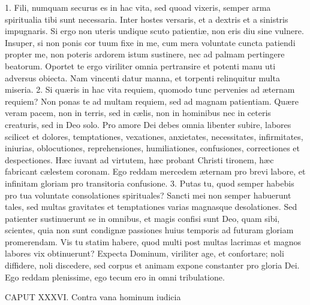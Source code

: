 1. Fili, numquam securus es in hac vita, sed quoad vixeris, semper arma spiritualia tibi sunt necessaria. Inter hostes versaris, et a dextris et a sinistris impugnaris. Si ergo non uteris undique scuto patientiæ, non eris diu sine vulnere. Insuper, si non ponis cor tuum fixe in me, cum mera voluntate cuncta patiendi propter me, non poteris ardorem istum sustinere, nec ad palmam pertingere beatorum. Oportet te ergo viriliter omnia pertransire et potenti manu uti adversus obiecta. Nam vincenti datur manna, et torpenti relinquitur multa miseria.
2. Si quæris in hac vita requiem, quomodo tunc pervenies ad æternam requiem? Non ponas te ad multam requiem, sed ad magnam patientiam. Quære veram pacem, non in terris, sed in cælis, non in hominibus nec in ceteris creaturis, sed in Deo solo. Pro amore Dei debes omnia libenter subire, labores scilicet et dolores, temptationes, vexationes, anxietates, necessitates, infirmitates, iniurias, oblocutiones, reprehensiones, humiliationes, confusiones, correctiones et despectiones. Hæc iuvant ad virtutem, hæc probant Christi tironem, hæc fabricant cælestem coronam. Ego reddam mercedem æternam pro brevi labore, et infinitam gloriam pro transitoria confusione.
3. Putas tu, quod semper habebis pro tua voluntate consolationes spirituales? Sancti mei non semper habuerunt tales, sed multas gravitates et temptationes varias magnasque desolationes. Sed patienter sustinuerunt se in omnibus, et magis confisi sunt Deo, quam sibi, scientes, quia non sunt condignæ passiones huius temporis ad futuram gloriam promerendam. Vis tu statim habere, quod multi post multas lacrimas et magnos labores vix obtinuerunt? Expecta Dominum, viriliter age, et confortare; noli diffidere, noli discedere, sed corpus et animam expone constanter pro gloria Dei. Ego reddam plenissime, ego tecum ero in omni tribulatione.


CAPUT XXXVI.
Contra vana hominum iudicia

